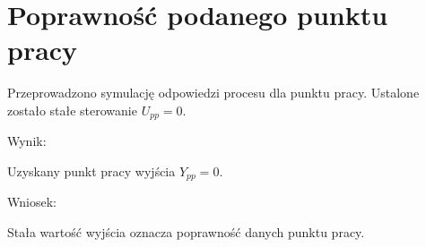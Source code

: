 \section{Poprawność podanego punktu pracy}
\label{projekt:zad1}
Przeprowadzono symulację odpowiedzi procesu dla punktu pracy. 
Ustalone zostało stałe sterowanie $U_{pp} = 0$.

%     


Wynik: 

\indent Uzyskany punkt pracy wyjścia $Y_{pp}=0$.

Wniosek: 

\indent Stała wartość wyjścia oznacza poprawność danych punktu pracy.

\newpage
